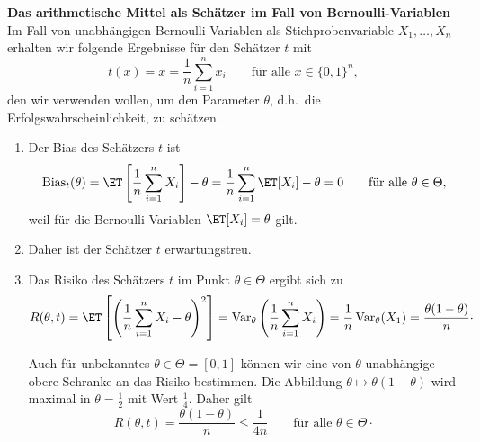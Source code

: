 \begin{bsp}\textbf{Das arithmetische Mittel als \gls{Schätzer} im Fall von \gls{Bernoulli-Variable}n}  \\
    Im Fall von unabhängigen \gls{Bernoulli-Variable}n als \gls{Stichprobenvariable} $X_1,\dots,X_n$ erhalten wir folgende Ergebnisse für den \gls{Schätzer} $t$ mit
    \[
        t(x) = \bar x = \frac1n\sum_{i=1}^n x_i \qquad \text{für alle } x\in\{0,1\}^n ,
    \]
    den wir verwenden wollen, um den Parameter $\theta$, d.h.\ die Erfolgswahrscheinlichkeit, zu schätzen.

    \begin{enumerate}[label=(\alph*)]
        \item Der Bias des \gls{Schätzer}s $t$ ist
        \[
            \mathrm{Bias}_t(\theta) = \ET\left[\frac1n\sum_{i=1}^n X_i\right] - \theta = \frac1n\sum_{i=1}^n \ET[X_i] - \theta = 0 \qquad \text{für alle } \theta\in\Theta ,
        \]
        weil für die \gls{Bernoulli-Variable}n $\ET[X_i]=\theta$ gilt.
        \item Daher ist der \gls{Schätzer} $t$ erwartungstreu.
        \item Das Risiko des \gls{Schätzer}s $t$ im Punkt $\theta\in\Theta$ ergibt sich zu
        \[
            R(\theta,t) = \ET\left[\left(\frac1n\sum_{i=1}^n X_i - \theta\right)^2\right] = \mathrm{Var}_\theta\left(\frac1n\sum_{i=1}^n X_i\right) = \frac1n\,\mathrm{Var}_\theta(X_1) = \frac{\theta(1-\theta)}{n} \cdot
        \]

        Auch für unbekanntes $\theta\in\Theta=[0,1]$ können wir eine von $\theta$ unabhängige obere Schranke an das Risiko bestimmen.
        Die Abbildung $\theta\mapsto\theta(1-\theta)$ wird maximal in $\theta=\frac12$ mit Wert $\frac14$.
        Daher gilt
        \[
            R(\theta,t) = \frac{\theta(1-\theta)}{n} \leq \frac{1}{4n} \qquad \text{für alle } \theta\in\Theta \cdot
        \]

        \begin{figure}[H]
            \label{fig:figure6}
        \end{figure}


\end{enumerate}
\end{bsp}
